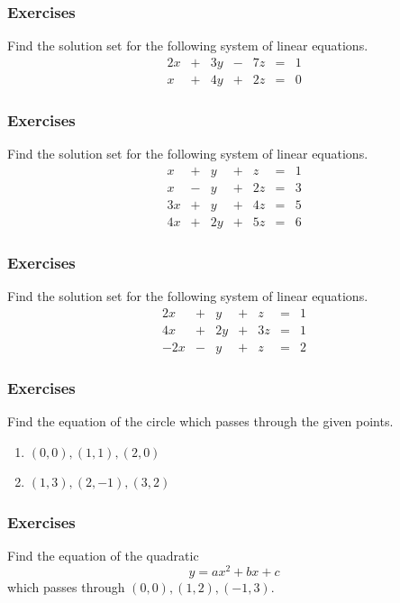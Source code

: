 \documentclass[xcolor=dvipsnames]{beamer}
\begin{document}
\begin{frame}
  \frametitle{Exercises}
  {\ubung} Find the solution set for the following system of linear
  equations.
  \begin{equation}
    \label{eq:aethahth}
    \begin{array}{ccccccc}
      2x&+&3y&-&7z&=&1 \\
      x&+&4y&+&2z&=&0
    \end{array}
  \end{equation}
\end{frame}

\begin{frame}
  \frametitle{Exercises}
  {\ubung} Find the solution set for the following system of linear
  equations.
  \begin{equation}
    \label{eq:bohzooch}
    \begin{array}{ccccccc}
      x&+&y&+&z&=&1 \\
      x&-&y&+&2z&=&3 \\
      3x&+&y&+&4z&=&5 \\
      4x&+&2y&+&5z&=&6
    \end{array}
  \end{equation}
\end{frame}

\begin{frame}
  \frametitle{Exercises}
  {\ubung} Find the solution set for the following system of linear
  equations.
  \begin{equation}
    \label{eq:seizoili}
    \begin{array}{ccccccc}
      2x&+&y&+&z&=&1 \\
      4x&+&2y&+&3z&=&1 \\
      -2x&-&y&+&z&=&2
    \end{array}
  \end{equation}
\end{frame}

\begin{frame}
  \frametitle{Exercises}
  {\ubung} Find the equation of the circle which passes through the
  given points.
  \begin{enumerate}
  \item $(0,0),(1,1),(2,0)$
  \item $(1,3),(2,-1),(3,2)$
  \end{enumerate}
\end{frame}

\begin{frame}
  \frametitle{Exercises}
  {\ubung} Find the equation of the quadratic
  \begin{equation}
    \label{eq:kieshiec}
    y=ax^{2}+bx+c
  \end{equation}
which passes through $(0,0),(1,2),(-1,3)$.
\end{frame}
\end{document}
